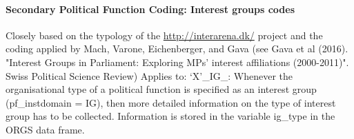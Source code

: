 \documentclass{article}
\begin{document}
\paragraph{Secondary Political Function Coding: Interest groups codes}

Closely based on the typology of the \url{http://interarena.dk/} project and the coding applied by Mach, Varone, Eichenberger, and Gava (see Gava et al (2016). "Interest Groups in Parliament: Exploring MPs' interest affiliations (2000-2011)". Swiss Political Science Review)
Applies to: `X'\_IG\_: Whenever the organisational type of a political function is specified as an interest group (pf\_instdomain = IG), then more detailed information on the type of interest group has to be collected. Information is stored in the variable ig\_type in the ORGS data frame.
\end{document}
